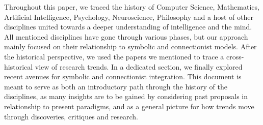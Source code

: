\documentclass[../main.tex]{subfiles}
\begin{document}
Throughout this paper, we traced the history of Computer Science, Mathematics, Artificial Intelligence, Psychology, Neuroscience, Philosophy and a host of other disciplines united towards a deeper understanding of intelligence and the mind. All mentioned disciplines have gone through various phases, but our approach mainly focused on their relationship to symbolic and connectionist models. After the historical perspective, we used the papers we mentioned to trace a cross-historical view of research trends. In a dedicated section, we finally explored recent avenues for symbolic and connectionist integration. This document is meant to serve as both an introductory path through the history of the disciplines, as many insights are to be gained by considering past proposals in relationship to present paradigms, and as a general picture for how trends move through discoveries, critiques and research.
\end{document}
